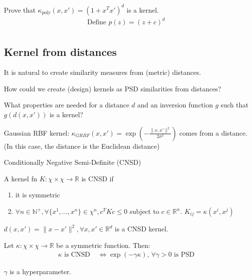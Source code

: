 \begin{example}{}{}
	Prove that $\kappa_{\text{poly}}(x,x') = \left(1 + x^Tx'\right)^d$ is a kernel.
	\begin{align*}
		\text{Define } p(z) = (z + c)^d \\
	\end{align*}
\end{example}

\pagebreak
\subsection{Kernel from distances}

It is natural to create similarity measures from (metric) distances.

\begin{question}{
		How could we create (design) kernels as PSD similarities from distances?
	}
	{}

	What properties are needed for a distance $d$ and an inversion function $g$
	such that $g(d(x,x'))$ is a kernel?
\end{question}

\begin{note}
	Gaussian RBF kernel: $\kappa_{GRBF}(x,x') = \exp\left(-\frac{\lVert x,x' \rVert^2}{2\sigma^2}\right)$
	comes from a distance. (In this case, the distance is the Euclidean distance)
\end{note}

\begin{definition}{Conditionally Negative Semi-Definite (CNSD)}{}

	A kernel fn $K: \mathcal \chi \times \mathcal \chi \to \mathbb R$ is CNSD if
	\begin{enumerate}
		\item it is symmetric
		\item $\forall n \in \mathds N^+, \forall \{x^1, \ldots, x^n\} \in \mathcal \chi^n, c^TKc \leq 0$ subject to $c \in \mathds R^n$. $K_{ij} = \kappa(x^i, x^j)$
	\end{enumerate}
\end{definition}

\begin{prop}{}{}
	$d(x, x') = \lVert x - x' \rVert^2, \forall x,x' \in \mathds R^d$
	is a CNSD kernel.
\end{prop}

\begin{theorem}{}{}
	Let $\kappa : \chi \times \chi \to \mathbb R$ be a symmetric
	function. Then:
	\begin{align*}
		\kappa\text{ is CNSD } & \iff
		\exp\left(-\gamma \kappa \right),\, \forall \gamma > 0\text{ is PSD}
	\end{align*}

	$\gamma$ is a hyperparameter.
\end{theorem}

